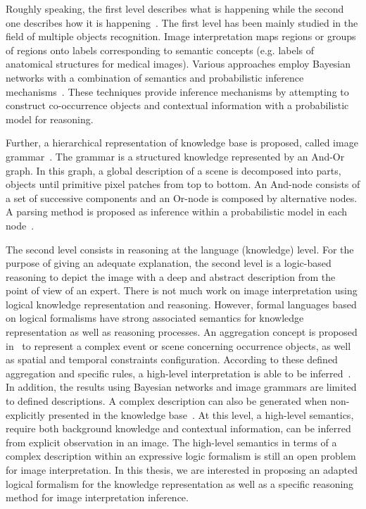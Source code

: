 \documentclass{article}
\begin{document}
Roughly speaking, the first level describes what is happening while the second one describes how it is happening~\cite{tsotsos1992image}.
The first level has been mainly studied in the field of multiple objects recognition. 
Image interpretation maps regions or groups of regions onto labels corresponding to semantic concepts (e.g. labels of anatomical structures for medical images).
Various approaches employ Bayesian networks with a combination of semantics and probabilistic inference mechanisms~\cite{Luo2005Bayesian,Niko2009evidence,Singhal2003proba}.
These techniques provide inference mechanisms by attempting to construct co-occurrence objects and contextual information with a probabilistic model for reasoning.

Further, a hierarchical representation of knowledge base is proposed, called image grammar~\cite{tu2014joint,zhu2006stochastic}. The grammar is a structured knowledge represented by an And-Or graph.
In this graph, a global description of a scene is decomposed into parts, objects until primitive pixel patches from top to bottom.
An And-node consists of a set of successive components and an Or-node is composed by alternative nodes.
A parsing method is proposed as inference within a probabilistic model in each node~\cite{han2009bottom,wu2011numerical}. 

The second level consists in reasoning at the language (knowledge) level.
For the purpose of giving an adequate explanation, the second level is a logic-based reasoning to depict the image with a deep and abstract description from the point of view of an expert.
There is not much work on image interpretation using logical knowledge representation and reasoning. 
However, formal languages based on logical formalisms have  strong associated semantics for knowledge representation as well as reasoning processes. 
An aggregation concept is proposed in~\cite{Espinosa07multimedia} to represent a complex event or scene concerning occurrence objects, as well as spatial and temporal constraints configuration.
According to these defined aggregation and specific rules, a high-level interpretation is able to be inferred~\cite{neumann2008scene}.
In addition, the results using Bayesian networks and image grammars are limited to defined descriptions.
A complex description can also be generated when non-explicitly presented in the knowledge base~\cite{atif2014explanatory}.
At this level, a high-level semantics, require both background knowledge and contextual information, can be inferred from explicit observation in an image.
The high-level semantics in terms of a complex description within an expressive logic formalism is still an open problem for image interpretation.
In this thesis, we are interested in proposing an adapted logical formalism for the knowledge representation as well as a specific reasoning method for image interpretation inference.
\end{document}
